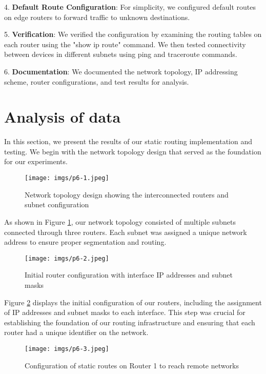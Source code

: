 \documentclass[twoside]{article}
\begin{document}
\begin{multicols}{2}
4. \textbf{Default Route Configuration}: For simplicity, we configured default routes on edge routers to forward traffic to unknown destinations.

5. \textbf{Verification}: We verified the configuration by examining the routing tables on each router using the "show ip route" command. We then tested connectivity between devices in different subnets using ping and traceroute commands.

6. \textbf{Documentation}: We documented the network topology, IP addressing scheme, router configurations, and test results for analysis.


\section{Analysis of data}
In this section, we present the results of our static routing implementation and testing. We begin with the network topology design that served as the foundation for our experiments.

\begin{figure}[H]
    \centering
    \texttt{[image: imgs/p6-1.jpeg]}
    \caption{Network topology design showing the interconnected routers and subnet configuration}
    \label{fig:1}
\end{figure}

As shown in Figure \ref{fig:1}, our network topology consisted of multiple subnets connected through three routers. Each subnet was assigned a unique network address to ensure proper segmentation and routing.

\begin{figure}[H]
    \centering
    \texttt{[image: imgs/p6-2.jpeg]}
    \caption{Initial router configuration with interface IP addresses and subnet masks}
    \label{fig:2}
\end{figure}

Figure \ref{fig:2} displays the initial configuration of our routers, including the assignment of IP addresses and subnet masks to each interface. This step was crucial for establishing the foundation of our routing infrastructure and ensuring that each router had a unique identifier on the network.

\begin{figure}[H]
    \centering
    \texttt{[image: imgs/p6-3.jpeg]}
    \caption{Configuration of static routes on Router 1 to reach remote networks}
    \label{fig:3}
\end{figure}


\end{multicols}
\end{document}
